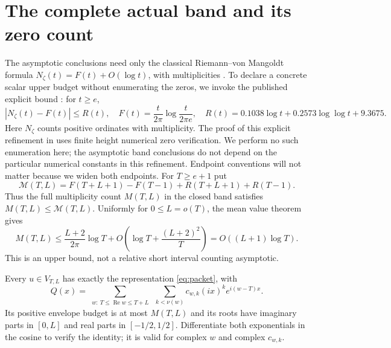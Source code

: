 \documentclass[11pt]{article}
\theoremstyle{remark}
\newcommand{\Rea}{\operatorname{Re}}
\begin{document}
\section{The complete actual band and its zero count}
The asymptotic conclusions need only the classical Riemann--von Mangoldt
formula $N_\zeta(t)=F(t)+O(\log t)$, with multiplicities
\cite{vonMangoldt,HSW}. To declare a concrete scalar upper budget without
enumerating the zeros, we invoke the published explicit bound
\cite[Corollary 1.2]{HSW}: for $t\ge e$,
\begin{equation}\label{eq:count}
 |N_\zeta(t)-F(t)|\le R(t),\quad
 F(t)=\frac{t}{2\pi}\log\frac{t}{2\pi e},\quad
 R(t)=0.1038\log t+0.2573\log\log t+9.3675.
\end{equation}
Here $N_\zeta$ counts positive ordinates with multiplicity. The proof of
this explicit refinement in \cite{HSW} uses finite height numerical zero
verification. We perform no such enumeration here; the asymptotic band
conclusions do not depend on the particular numerical constants in this
refinement. Endpoint conventions will not matter because we widen both endpoints.
For $T\ge e+1$ put
\begin{equation}\label{eq:countbudget}
 \mathcal M(T,L)=F(T+L+1)-F(T-1)+R(T+L+1)+R(T-1).
\end{equation}
Thus the full multiplicity count $M(T,L)$ in the closed band satisfies
$M(T,L)\le\mathcal M(T,L)$.
Uniformly for $0\le L=o(T)$, the mean value theorem gives
\begin{equation}\label{eq:count-asym}
 M(T,L)\le\frac{L+2}{2\pi}\log T+
       O\left(\log T+\frac{(L+2)^2}{T}\right)
       =O((L+1)\log T).
\end{equation}
This is an upper bound, not a relative short interval counting asymptotic.

Every $u\in V_{T,L}$ has exactly the representation \eqref{eq:packet}, with
\begin{equation}\label{eq:actual-envelope}
 Q(x)=\sum_{\substack{w:\ T\le\Rea w\le T+L}}
       \ \sum_{k<\nu(w)}c_{w,k}(ix)^k e^{i(w-T)x}.
\end{equation}
Its positive envelope budget is at most $M(T,L)$ and its roots have
imaginary parts in $[0,L]$ and real parts in $[-1/2,1/2]$.
Differentiate both exponentials in the cosine to verify the identity;
it is valid for complex $w$ and complex $c_{w,k}$.
\end{document}
